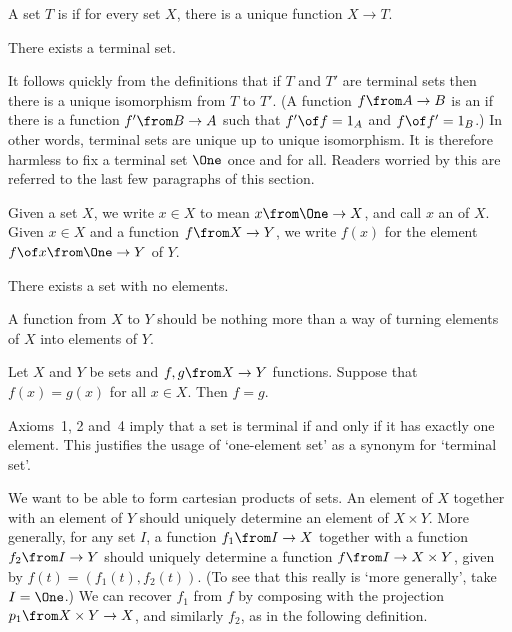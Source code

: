 \documentclass[12pt]{article}
\begin{document}
\begin{dfn}
A set $T$ is  if for every set $X$, there is a unique
function $X \to T$.
\end{dfn}

\begin{axiom}{2}
There exists a terminal set.
\end{axiom}

It follows quickly from the definitions that if $T$ and $T'$ are terminal
sets then there is a unique isomorphism from $T$ to $T'$.  (A function $f
\from A \to B$ is an  if there is a function $f' \from B
\to A$ such that $f' \of f = 1_A$ and $f \of f' = 1_B$.)  In other words,
terminal sets are unique up to unique isomorphism.  It is therefore
harmless to fix a terminal set $\One$ once and for all.  Readers worried by
this are referred to the last few paragraphs of this section.

\begin{dfn}
Given a set $X$, we write $x \in X$ to mean $x\from \One \to X$, and call
$x$ an  of $X$.  Given $x \in X$ and a function $f\from X
\to Y$, we write $f(x)$ for the element $f \of x\from \One \to Y$ of
$Y$. 
\end{dfn}



\begin{axiom}{3}
There exists a set with no elements.
\end{axiom}


% 
A function from $X$ to $Y$ should be nothing more than a way of turning
elements of $X$ into elements of $Y$.  

\begin{axiom}{4}
Let $X$ and $Y$ be sets and $f, g\from X \to Y$ functions.  Suppose that
$f(x) = g(x)$ for all $x \in X$.  Then $f = g$.
\end{axiom}

Axioms~1, 2 and~4 imply that a set is terminal if and only if it has
exactly one element.  This justifies the usage of `one-element set' as a
synonym for `terminal set'.


% 
We want to be able to form cartesian products of sets.  An element of $X$
together with an element of $Y$ should uniquely determine an element of $X
\times Y$.  More generally, for any set $I$, a function $f_1 \from I \to X$
together with a function $f_2 \from I \to Y$ should uniquely determine a
function $f \from I \to X \times Y$, given by $f(t) = (f_1(t),
f_2(t))$.  (To see that this really is `more generally', take $I =
\One$.)  We can recover $f_1$ from $f$ by composing with the projection
$p_1 \from X \times Y \to X$, and similarly $f_2$, as in the following
definition. 
\end{document}
